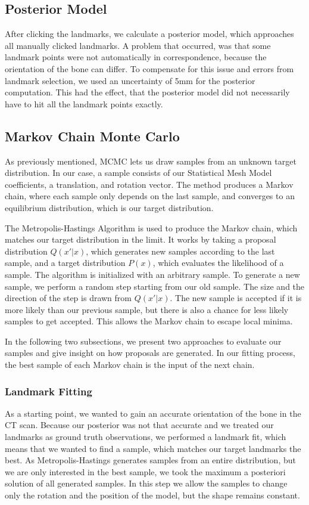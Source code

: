 \documentclass{IEEEtran}
\begin{document}
\subsection{Posterior Model}\label{posterior}
After clicking the landmarks, we calculate a posterior model, which approaches all manually clicked landmarks.
A problem that occurred, was that some landmark points were not automatically in correspondence, because the orientation of the bone can differ. To compensate for this issue and errors from landmark selection, we used an uncertainty of 5mm for the posterior computation. This had the effect, that the posterior model did not necessarily have to hit all the landmark points exactly.

\subsection{Markov Chain Monte Carlo}
As previously mentioned, MCMC lets us draw samples from an unknown target distribution. In our case, a sample consists of our Statistical Mesh Model coefficients, a translation, and rotation vector. The method produces a Markov chain, where each sample only depends on the last sample, and converges to an equilibrium distribution, which is our target distribution.\par
The Metropolis-Hastings Algorithm is used to produce the Markov chain, which matches our target distribution in the limit. It works by taking a proposal distribution $Q(x'|x)$, which generates new samples according to the last sample, and a target distribution $P(x)$, which evaluates the likelihood of a sample. The algorithm is initialized with an arbitrary sample. To generate a new sample, we perform a random step starting from our old sample. The size and the direction of the step is drawn from $Q(x'|x)$. The new sample is accepted if it is more likely than our previous sample, but there is also a chance for less likely samples to get accepted. This allows the Markov chain to escape local minima.\par
In the following two subsections, we present two approaches to evaluate our samples and give insight on how proposals are generated. In our fitting process, the best sample of each Markov chain is the input of the next chain.

\subsubsection{Landmark Fitting}
As a starting point, we wanted to gain an accurate orientation of the bone in the CT scan. Because our posterior was not that accurate and we treated our landmarks as ground truth observations, we performed a landmark fit, which means that we wanted to find a sample, which matches our target landmarks the best. As Metropolis-Hastings generates samples from an entire distribution, but we are only interested in the best sample, we took the maximum a posteriori solution of all generated samples. In this step we allow the samples to change only the rotation and the position of the model, but the shape remains constant.
\end{document}
